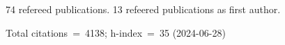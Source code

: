74 refereed publications. 13 refeered publications as first author.

Total citations~=~4138; h-index~=~35 (2024-06-28)